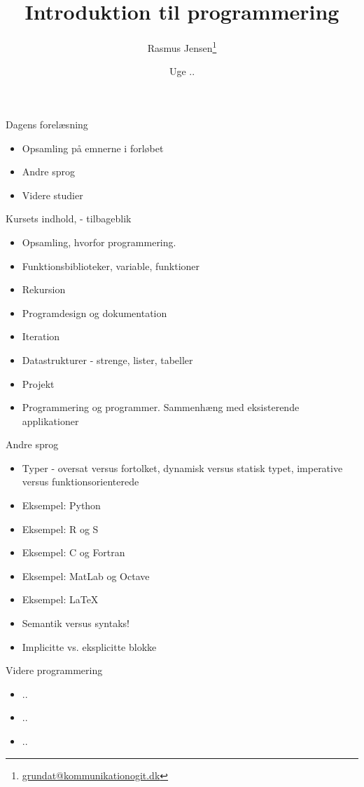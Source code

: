 \documentclass[a4paper,landscape]{slides}
\title{Introduktion til programmering}
\author{Rasmus Jensen\footnote{\url{grundat@kommunikationogit.dk}}}
\date{Uge ..}
\begin{document}
\maketitle


\begin{slide}
	\begin{center} {\large 
		Dagens forelæsning
	} \end{center}
	\begin{itemize} \addtolength{\itemsep}{-\baselineskip}
    		\item Opsamling på emnerne i forløbet
    		\item Andre sprog
    		\item Videre studier
	\end{itemize}
\end{slide}


\begin{slide}
	\begin{center} {\large 
		Kursets indhold, - tilbageblik
	} \end{center}
	\begin{itemize} \addtolength{\itemsep}{-\baselineskip}
		\item Opsamling, hvorfor programmering.
		\item Funktionsbiblioteker, variable, funktioner
		\item Rekursion
		\item Programdesign og dokumentation
		\item Iteration
		\item Datastrukturer - strenge, lister, tabeller
		\item Projekt 
		\item Programmering og programmer. Sammenhæng med eksisterende applikationer
	\end{itemize}
\end{slide}


\begin{slide}
	\begin{center} {\large 
		Andre sprog
	} \end{center}
	\begin{itemize} \addtolength{\itemsep}{-\baselineskip}
		\item Typer - oversat versus fortolket, dynamisk versus statisk typet, imperative versus funktionsorienterede
		\item Eksempel: Python
		\item Eksempel: R og S
		\item Eksempel: C og Fortran
		\item Eksempel: MatLab og Octave
		\item Eksempel: \LaTeX
		\item Semantik versus syntaks!
		\item Implicitte vs. eksplicitte blokke
	\end{itemize}
\end{slide}


\begin{slide}
	\begin{center} {\large 
		Videre programmering
	} \end{center}
	\begin{itemize} \addtolength{\itemsep}{-\baselineskip}
		\item ..
		\item ..
		\item ..
	\end{itemize}
\end{slide}
\end{document}
